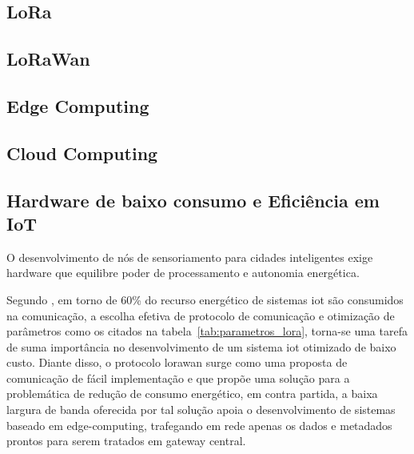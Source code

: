 
\subsection{LoRa}



\subsection{LoRaWan}



\subsection{Edge Computing}


\subsection{Cloud Computing}


\subsection{Hardware de baixo consumo e Eficiência em IoT}

O desenvolvimento de nós de sensoriamento para cidades inteligentes exige hardware que equilibre poder de processamento e autonomia energética.

Segundo , em torno de 60\% do recurso energético de sistemas \gls{iot} são consumidos na comunicação, a escolha efetiva de protocolo de comunicação e otimização de parâmetros como os citados na tabela~\ref{tab:parametros_lora}, torna-se uma tarefa de suma importância no desenvolvimento de um sistema \gls{iot} otimizado de baixo custo.
Diante disso, o protocolo \gls{lorawan} surge como uma proposta de comunicação de fácil implementação e que propõe uma solução para a problemática de redução de consumo energético, em contra partida, a baixa largura de banda oferecida por tal solução apoia o desenvolvimento de sistemas baseado em edge-computing, trafegando em rede apenas os dados e metadados prontos para serem tratados em gateway central.

